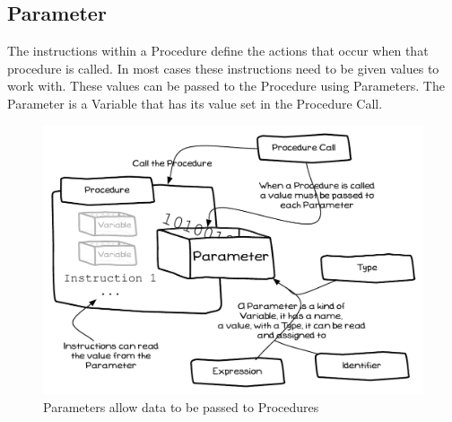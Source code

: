 \clearpage
\subsection{Parameter} %
\label{sub:parameter}

The instructions within a Procedure define the actions that occur when that procedure is called. In most cases these instructions need to be given values to work with. These values can be passed to the Procedure using Parameters. The Parameter is a Variable that has its value set in the Procedure Call.

\begin{figure}[h]
   \centering
   \includegraphics[width=\textwidth]{./topics/storing-using-data/diagrams/Parameter} 
   \caption{Parameters allow data to be passed to Procedures}
   \label{fig:parameters-parameters}
\end{figure}


